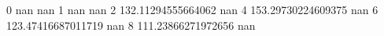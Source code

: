 0 nan nan
1 nan nan
2 132.11294555664062 nan
4 153.29730224609375 nan
6 123.47416687011719 nan
8 111.23866271972656 nan

